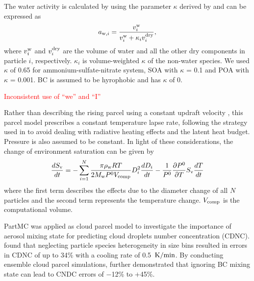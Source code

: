\documentclass[edeposit,fullpage]{uiucthesis2009}
\makeatletter
\DeclareRobustCommand*\unit[1]
 {\ensuremath{%
   {\thinmuskip3mu\relax
    \def\mu{\text{\textmu}}\def~{\,}%
    \ifx\f@series\testbx\mathbf{#1}\else\mathrm{#1}\fi}}}
\makeatother
\begin{document}
The water activity is calculated by using the parameter $\kappa$ derived by \citet{Petters2007} and can be expressed as
\begin{equation}
\centering
a_{{\rm w},i} = \frac{v_i^{\rm w}}{v_i^{\rm w} + \kappa_i v_i^{\rm dry}},
\label{eq:activity coeff}    
\end{equation}
where $v_i^{\rm w}$ and $v_i^{\rm dry}$ are the volume of water and
all the other dry components in particle $i$, respectively. $\kappa_i$
is volume-weighted $\kappa$ of the non-water species. We used $\kappa$
of 0.65 for ammonium-sulfate-nitrate system, SOA with $\kappa$ = 0.1
and POA with $\kappa$ = 0.001. BC is assumed to be hyrophobic and has
$\kappa$ of 0.

\textcolor{red}{Inconsistent use of ``we'' and ``I''}

Rather than describing the rising parcel using a constant updraft
velocity \citep{Seinfeld2016,rothenberg2016metamodeling}, this parcel
model prescribes a constant temperature lapse rate, following the
strategy used in \citet{majeed2001microphysics} to avoid dealing with
radiative heating effects and the latent heat budget. Pressure is also
assumed to be constant. In light of these considerations, the change
of environment saturation can be given by
\begin{equation}
    \centering
    \frac{dS_{\rm v}}{dt} = -\sum_{i=1}^{N}\frac{\pi \rho_{\rm w} RT}{2M_{\rm w}P^0V_{\rm comp}}D_i^2\frac{dD_i}{dt} - \frac{1}{P^0}\frac{\partial P^0}{\partial T}S_{\rm v}\frac{dT}{dt}
\end{equation}
where the first term describes the effects due to the diameter change
of all $N$ particles and the second term represents the temperature
change. $V_{\rm comp}$ is the computational volume.

PartMC was applied as cloud parcel model to investigate the importance
of aerosol mixing state for predicting cloud droplets number
concentration (CDNC). \citet{ching2012impacts} found that neglecting
particle species heterogeneity in size bins resulted in errors in CDNC
of up to 34\% with a cooling rate of 0.5~\unit{K/min}. By conducting
ensemble cloud parcel simulations, \citet{Ching2016} further
demonstrated that ignoring BC mixing state can lead to CNDC errors of
$-$12\% to $+$45\%.

\end{document}
